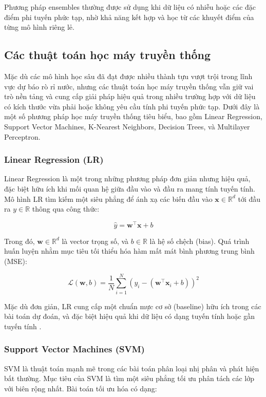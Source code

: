 Phương pháp ensembles thường được sử dụng khi dữ liệu có nhiễu hoặc các đặc điểm phi tuyến phức tạp, nhờ khả năng kết hợp và học từ các khuyết điểm của từng mô hình riêng lẻ.

\subsection{Các thuật toán học máy truyền thống}

Mặc dù các mô hình học sâu đã đạt được nhiều thành tựu vượt trội trong lĩnh vực dự báo rò rỉ nước, nhưng các thuật toán học máy truyền thống vẫn giữ vai trò nền tảng và cung cấp giải pháp hiệu quả trong nhiều trường hợp với dữ liệu có kích thước vừa phải hoặc không yêu cầu tính phi tuyến phức tạp. Dưới đây là một số phương pháp học máy truyền thống tiêu biểu, bao gồm Linear Regression, Support Vector Machines, K-Nearest Neighbors, Decision Trees, và Multilayer Perceptron.

\subsubsection*{Linear Regression (LR)}

Linear Regression là một trong những phương pháp đơn giản nhưng hiệu quả, đặc biệt hữu ích khi mối quan hệ giữa đầu vào và đầu ra mang tính tuyến tính. Mô hình LR tìm kiếm một siêu phẳng để ánh xạ các biến đầu vào \(\mathbf{x} \in \mathbb{R}^d\) tới đầu ra \(y \in \mathbb{R}\) thông qua công thức:

\[
\hat{y} = \mathbf{w}^\top \mathbf{x} + b
\]

Trong đó, \(\mathbf{w} \in \mathbb{R}^d\) là vector trọng số, và \(b \in \mathbb{R}\) là hệ số chệch (bias). Quá trình huấn luyện nhằm mục tiêu tối thiểu hóa hàm mất mát bình phương trung bình (MSE):

\[
\mathcal{L}(\mathbf{w}, b) = \frac{1}{N} \sum_{i=1}^N \left(y_i - (\mathbf{w}^\top \mathbf{x}_i + b)\right)^2
\]

Mặc dù đơn giản, LR cung cấp một chuẩn mực cơ sở (baseline) hữu ích trong các bài toán dự đoán, và đặc biệt hiệu quả khi dữ liệu có dạng tuyến tính hoặc gần tuyến tính \cite{montgomery2012linear}.

\subsubsection*{Support Vector Machines (SVM)}

SVM là thuật toán mạnh mẽ trong các bài toán phân loại nhị phân và phát hiện bất thường. Mục tiêu của SVM là tìm một siêu phẳng tối ưu phân tách các lớp với biên rộng nhất. Bài toán tối ưu hóa có dạng:

